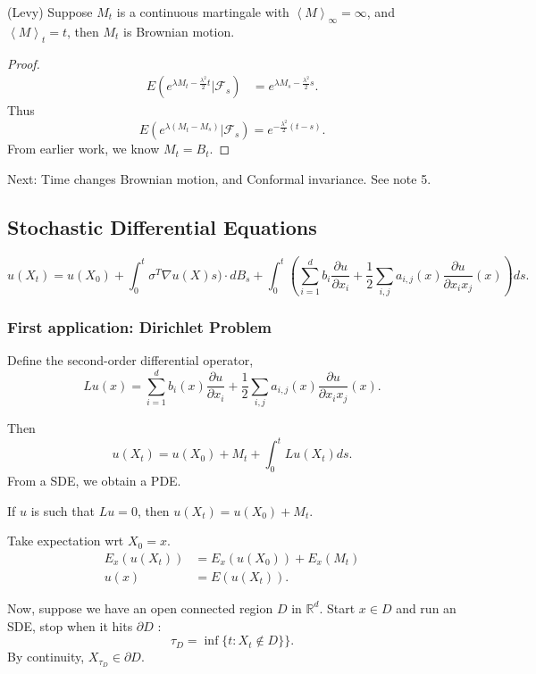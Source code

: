 \begin{theorem}(Levy)
	Suppose $M_t$ is a continuous martingale with $\left\langle M \right\rangle _{\infty } = \infty $, and $\left\langle M \right\rangle _t = t$, then $M_t$ is Brownian motion.
\end{theorem}
\begin{proof}
	\begin{align*}
		E (e^{\lambda M_t - \frac{\lambda^2}{2}t} | \mathcal{F}_s)
		&= e^{\lambda M_s - \frac{\lambda^2}{2} s} 
	.\end{align*}
	Thus
	\[
		E\left( e^{\lambda (M_t - M_s)} | \mathcal{F}_s \right) 
		= e^{- \frac{\lambda^2}{2}(t - s)}
	.\] 
	From earlier work, we know $M_t = B_t$.
\end{proof}

Next: 
Time changes Brownian motion, and
Conformal invariance. See note 5.


\subsection{Stochastic Differential Equations}


\[
	u(X_t) = 
	u(X_0) + \int _0^t \sigma^T \nabla u(X)s) \cdot  d B_s + \int _0^t \left(\sum_{i=1}^{d} b_i \frac{\partial u}{\partial x_i} + \frac{1}{2} \sum_{i , j} a_{i,j}(x) \frac{\partial u}{\partial x_i x_j} (x) \right)  ds
.\] 

\subsubsection{First application: Dirichlet Problem}




Define the second-order differential operator,
\[
	L u(x) = \sum_{i=1}^{d} b_i(x) \frac{\partial u}{\partial x_i} + \frac{1}{2} \sum_{i , j} a_{i,j}(x) \frac{\partial u}{\partial x_i x_j} (x)
.\] 

Then
\[
	u(X_t) = u(X_0) + M_t + \int _0^t L u(X_t) ds
.\] 
From a SDE, we obtain a PDE.

If $u$ is such that $L u = 0$, then $u(X_t) = u(X_0) + M_t$.

Take expectation wrt $X_0 = x$. 
\begin{align*}
	E_x\left( u(X_t) \right) 
	&= E_x\left( u(X_0) \right) + E_x(M_t) \\
	u(x) &= E(u(X_t)) 
.\end{align*}


Now, suppose we have an open connected region $D$ in $\mathbb{R}^d$. Start $x \in D$ and run an SDE, stop when it hits $\partial D$ :
\[
	\tau_D = \inf \{t: X_t \not\in D\}\} 
.\] 
By continuity, $X_{\tau_D} \in \partial D$.

